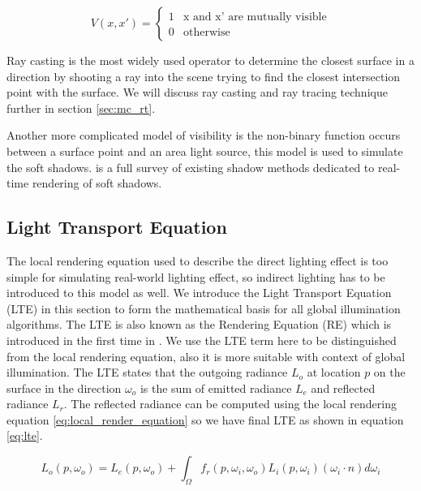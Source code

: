  \begin{equation}
    V(x, x')=\left\{
    \begin{array}{ll}
      1  & \text{x and x' are mutually visible} \\
      0  & \text{otherwise}
    \end{array}
    \right.
  \end{equation}

Ray casting is the most widely used operator to determine the closest surface in a direction by shooting a ray into the scene trying to find the closest intersection point with the surface. We will discuss ray casting and ray tracing technique further in section \ref{sec:mc_rt}.

Another more complicated model of visibility is the non-binary function occurs between a surface point and an area light source, this model is used to simulate the soft shadows.  \cite{Hasenfratz2003} is a full survey of existing shadow methods dedicated to real-time rendering of soft shadows.

\subsection{Light Transport Equation}

The local rendering equation used to describe the direct lighting effect is too simple for simulating real-world lighting effect, so indirect lighting has to be introduced to this model as well. We introduce the Light Transport Equation (LTE) in this section to form the mathematical basis for all global illumination algorithms. The LTE is also known as the Rendering Equation (RE) which is introduced in the first time in \cite{Kajiya:1986:RE:15922.15902}. We use the LTE term here to be distinguished from the local rendering equation, also it is more suitable with context of global illumination. The LTE states that the outgoing radiance \(L_{o}\) at location \(p\) on the surface in the direction \(\omega_{o}\) is the sum of emitted radiance \(L_{e}\) and reflected radiance \(L_{r}\). The reflected radiance can be computed using the local rendering equation \ref{eq:local_render_equation} so we have final LTE as shown in equation \ref{eq:lte}.

\begin{equation}
L_{o}(p, \omega_{o}) = L_{e}(p, \omega_{o}) + \int_{\Omega}f_{r}(p, \omega_{i}, \omega_{o})L_{i}(p, \omega_{i})(\omega_{i} \cdot n)d\omega_{i}
\label{eq:lte}
\end{equation}

